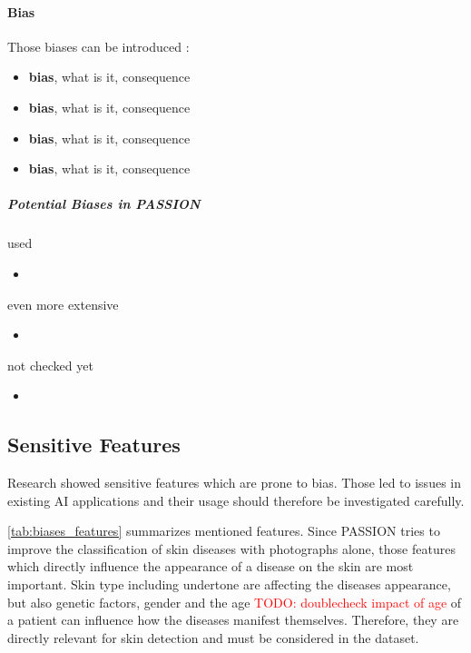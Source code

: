 \documentclass[12pt, a4paper, oneside]{book}   	%
\renewcommand{\todo}[1]{\textcolor{red}{TODO: #1}}
\newif\ifrawcitationactive
\newcommand{\rawcitationstart}{\color{purple}\rawcitationactivetrue}
\newcommand{\rawcitationend}{\color{black}\rawcitationactivefalse}
\newcommand{\rawcitationusedstart}{\color{violet}}
\newcommand{\rawcitationusedend}{%
	\ifrawcitationactive
	\color{purple}  %
	\else
	\color{black}  %
	\fi
}
\begin{document}
			\paragraph{ Bias \autocite{Mehrabi_2021} \autocite{Chakraborty_2024}}
			
			Those biases can be introduced :
			\begin{itemize}
				\item \textbf{bias}, what is it, consequence \autocite{}
				\item \textbf{bias}, what is it, consequence \autocite{}
				\item \textbf{bias}, what is it, consequence \autocite{}
				\item \textbf{bias}, what is it, consequence \autocite{}
			\end{itemize}
			
			
			\subparagraph{Potential Biases in PASSION}
			
			\rawcitationstart
			used
			\begin{itemize}		
				\rawcitationusedstart
				\item 
				\rawcitationusedend
			\end{itemize}
			
			even more extensive
			\begin{itemize}
				\item 
			\end{itemize}
			
			not checked yet
			\begin{itemize}
				\item 
			\end{itemize}
			\rawcitationend
			
			
			\subsection{Sensitive Features}
			Research showed sensitive features which are prone to bias. Those led to issues in existing AI applications and their usage should therefore be investigated carefully.
			
			\ref{tab:biases_features} summarizes mentioned features. Since PASSION tries to improve the classification of skin diseases with photographs alone, those features which directly influence the appearance of a disease on the skin are most important. Skin type including undertone are affecting the diseases appearance, but also genetic factors, gender and the age \todo{doublecheck impact of age} of a patient can influence how the diseases manifest themselves. Therefore, they are directly relevant for skin detection and must be considered in the dataset.
			
\end{document}
